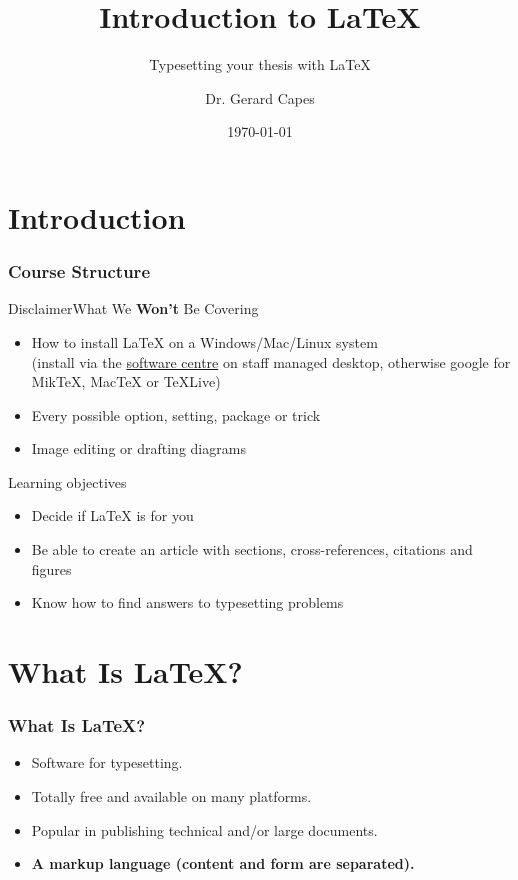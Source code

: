 \documentclass[12pt]{beamer}
\title{Introduction to \LaTeX}
\subtitle{Typesetting your thesis with \LaTeX}
\author{Dr. Gerard Capes}
\institute{Research IT\\University of Manchester}
\date{\today{}}
\begin{document}
\begin{frame}
	\titlepage
\end{frame}

\section{Introduction}

\begin{frame}
	\frametitle{Course Structure}
	\tableofcontents
\end{frame}

\begin{frame}{Disclaimer}{What We \textbf{Won't} Be Covering}
	\begin{itemize}
		\item How to install \LaTeX{} on a Windows/Mac/Linux system\\
		(install via the \href{http://softwarecentre.itservices.manchester.ac.uk/}{software centre} on staff managed desktop, otherwise google for MikTeX, MacTeX or TeXLive)
		\item Every possible option, setting, package or trick
		\item Image editing or drafting diagrams
	\end{itemize}
\end{frame}

\begin{frame}{Learning objectives}
	\begin{itemize}
		\item Decide if \LaTeX{} is for you
		\item Be able to create an article with sections, cross-references, citations and figures
		\item Know how to find answers to typesetting problems
	\end{itemize}
\end{frame}

\section{What Is \LaTeX?}

\begin{frame} \frametitle{What Is \LaTeX?}
	\begin{itemize}
		\item Software for typesetting.
		\item Totally free and available on many platforms.
		\item Popular in publishing technical and/or large documents.
		\item \textbf{A markup language (content and form are separated).}
	\end{itemize}
\end{frame}
\end{document}
